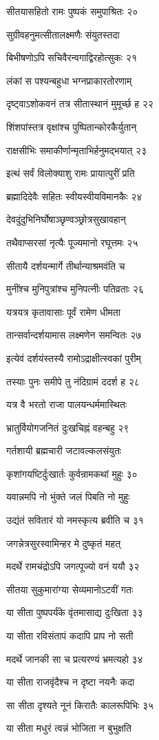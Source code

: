 सीतयासहितो रामः पुष्पकं समुपाश्रितः २०

सुग्रीवहनुमत्सीतालक्ष्मणैः संयुतस्तदा

बिभीषणोऽपि सचिवैरन्वगाद्विरहोत्सुकः २१

लंकां स पश्यन्बहुधा भग्नप्राकारतोरणाम्

दृष्ट्वाऽशोकवनं तत्र सीतास्थानं मुमूर्च्छ ह २२

शिंशपांस्तत्र वृक्षांश्च पुष्पितान्कोरकैर्युतान्

राक्षसीभिः समाकीर्णान्मृताभिर्हनुमद्भयात् २३

इत्थं सर्वं विलोक्याशु रामः प्रायात्पुरीं प्रति

ब्रह्मादिदेवैः सहितः स्वीयस्वीयविमानकैः २४

देवदुंदुभिनिर्घोषाञ्छृण्वञ्छ्रोत्रसुखावहान्

तथैवाप्सरसां नृत्यैः पूज्यमानो रघूत्तमः २५

सीतायै दर्शयन्मार्गे तीर्थान्याश्रमवंति च

मुनींश्च मुनिपुत्रांश्च मुनिपत्नीः पतिव्रताः २६

यत्रयत्र कृतावासाः पूर्वं रामेण धीमता

तान्सर्वान्दर्शयामास लक्ष्मणेन समन्वितः २७

इत्येवं दर्शयंस्तस्यै रामोऽद्राक्षीत्स्वकां पुरीम्

तस्याः पुनः समीपे तु नंदिग्रामं ददर्श ह २८

यत्र वै भरतो राजा पालयन्धर्ममास्थितः

भ्रातुर्वियोगजनितं दुःखचिह्नं वहन्बहु २९

गर्तशायी ब्रह्मचारी जटावल्कलसंयुतः

कृशांगयष्टिर्दुःखार्तः कुर्वन्रामकथां मुहुः ३०

यवान्नमपि नो भुंक्ते जलं पिबति नो मुहुः

उद्यंतं सवितारं यो नमस्कृत्य ब्रवीति च ३१

जगन्नेत्रसुरस्वामिन्हर मे दुष्कृतं महत्

मदर्थे रामचंद्रोऽपि जगत्पूज्यो वनं ययौ ३२

सीतया सुकुमारांग्या सेव्यमानोऽटवीं गतः

या सीता पुष्पपर्यंके वृंतमासाद्य दुःखिता ३३

या सीता रविसंतापं कदापि प्राप नो सती

मदर्थे जानकी सा च प्रत्यरण्यं भ्रमत्यहो ३४

या सीता राजवृंदैश्च न दृष्टा नयनैः कदा

सा सीता दृश्यते नूनं किरातैः कालरूपिभिः ३५

या सीता मधुरं त्वन्नं भोजिता न बुभुक्षति

